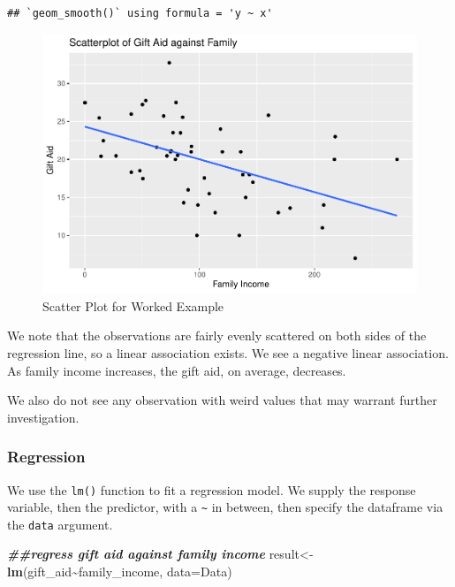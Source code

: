 \documentclass[
]{book}
\newenvironment{Shaded}{\begin{snugshade}}{\end{snugshade}}
\newcommand{\AttributeTok}[1]{\textcolor[rgb]{0.13,0.29,0.53}{#1}}
\newcommand{\DocumentationTok}[1]{\textcolor[rgb]{0.56,0.35,0.01}{\textbf{\textit{#1}}}}
\newcommand{\FunctionTok}[1]{\textcolor[rgb]{0.13,0.29,0.53}{\textbf{#1}}}
\newcommand{\NormalTok}[1]{#1}
\newcommand{\OtherTok}[1]{\textcolor[rgb]{0.56,0.35,0.01}{#1}}
\newcommand{\SpecialCharTok}[1]{\textcolor[rgb]{0.81,0.36,0.00}{\textbf{#1}}}
\begin{document}
\begin{verbatim}
## `geom_smooth()` using formula = 'y ~ x'
\end{verbatim}

\begin{figure}
\centering
\includegraphics{bookdown-demo_files/figure-latex/10-scatter-eg-1.pdf}
\caption{\label{fig:10-scatter-eg}Scatter Plot for Worked Example}
\end{figure}

We note that the observations are fairly evenly scattered on both sides of the regression line, so a linear association exists. We see a negative linear association. As family income increases, the gift aid, on average, decreases.

We also do not see any observation with weird values that may warrant further investigation.

\hypertarget{regression}{%
\subsubsection*{Regression}\label{regression}}

We use the \texttt{lm()} function to fit a regression model. We supply the response variable, then the predictor, with a \texttt{\textasciitilde{}} in between, then specify the dataframe via the \texttt{data} argument.

\begin{Shaded}
\begin{Highlighting}[]
\DocumentationTok{\#\#regress gift aid against family income}
\NormalTok{result}\OtherTok{\textless{}{-}}\FunctionTok{lm}\NormalTok{(gift\_aid}\SpecialCharTok{\textasciitilde{}}\NormalTok{family\_income, }\AttributeTok{data=}\NormalTok{Data)}
\end{Highlighting}
\end{Shaded}
\end{document}
